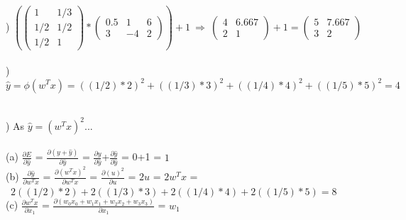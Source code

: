 \documentclass[12pt]{article}
\begin{document}
\noindent \hrulefill \\



) $\left(
\begin{pmatrix}
1 & 1/3 \\
1/2 & 1/2 \\
1/2 & 1
\end{pmatrix} * 
\begin{pmatrix}
0.5 & 1 & 6 \\
3 & -4 & 2
\end{pmatrix}\right) + 1 \ \Rightarrow \
\begin{pmatrix}
4 & 6.667 \\
2 & 1
\end{pmatrix} + 1 = 
\begin{pmatrix}
5 & 7.667 \\
3 & 2
\end{pmatrix}$\\



\noindent \hrulefill \\



) $\hat y = \phi(w^Tx) = ((1/2)*2)^2+((1/3)*3)^2+((1/4)*4)^2+((1/5)*5)^2 = 4$\\[-.4em]



\noindent \hrulefill \\\pagebreak



) As $\hat y = (w^Tx)^2$...\\\\
\indent (a) {\Large $\frac{\partial E}{\partial \hat y}$} = {\Large $\frac{\partial (y + \hat y)}{\partial \hat y}$} = {\Large $\frac{\partial y}{\partial \hat y}$}+{\Large $\frac{\partial \hat y}{\partial \hat y}$} = 0+1 = $1$\\[.4em]

\indent (b) {\Large $\frac{\partial \hat y}{\partial w^Tx}$} = {\Large $\frac{\partial (w^Tx)^2}{\partial w^Tx}$} = {\Large $\frac{\partial (u)^2}{\partial u}$} = $2u$ = $2w^Tx$ =\\[.4em]
\indent \indent \ $2((1/2)*2)+2((1/3)*3)+2((1/4)*4)+2((1/5)*5) = 8$\\[.4em]

\indent (c) {\Large $\frac{\partial w^Tx}{\partial x_1}$} = {\Large $\frac{\partial (w_0x_0 + w_1x_1 + w_2x_2 + w_3x_3)}{\partial x_1}$} = $w_1$\\[.4em]
\end{document}
